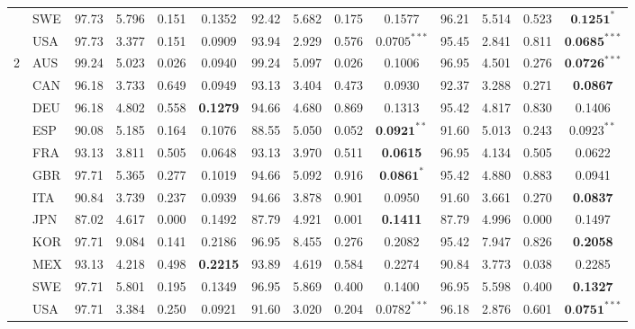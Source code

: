 \begin{tabular}{llcccccccccccc}
 &     SWE  &  97.73  &  5.796  &  0.151  &  0.1352  &  92.42  &  5.682  &  0.175  &  0.1577  &  96.21  &  5.514  &  0.523  & $\textbf{0.1251}^{*}$ \\
 &     USA  &  97.73  &  3.377  &  0.151  &  0.0909  &  93.94  &  2.929  &  0.576  & $ 0.0705 ^{***}$ &  95.45  &  2.841  &  0.811  & $\textbf{0.0685}^{***}$ \\
\toprule
\multirow{12}{*}{{2}}
                        &  AUS  &  99.24  &  5.023  &  0.026  &  0.0940  &  99.24  &  5.097  &  0.026  &  0.1006  &  96.95  &  4.501  &  0.276  & $\textbf{0.0726}^{***}$ \\
 &     CAN  &  96.18  &  3.733  &  0.649  &  0.0949  &  93.13  &  3.404  &  0.473  &  0.0930  &  92.37  &  3.288  &  0.271  &  \textbf{0.0867} \\ 
 &     DEU  &  96.18  &  4.802  &  0.558  &  \textbf{0.1279}  &  94.66  &  4.680  &  0.869  &  0.1313  &  95.42  &  4.817  &  0.830  &  0.1406 \\ 
 &     ESP  &  90.08  &  5.185  &  0.164  &  0.1076  &  88.55  &  5.050  &  0.052  & $ \textbf{0.0921} ^{**}$ &  91.60  &  5.013  &  0.243  & $0.0923^{**}$ \\
 &     FRA  &  93.13  &  3.811  &  0.505  &  0.0648  &  93.13  &  3.970  &  0.511  &  \textbf{0.0615}  &  96.95  &  4.134  &  0.505  &  0.0622 \\ 
 &     GBR  &  97.71  &  5.365  &  0.277  &  0.1019  &  94.66  &  5.092  &  0.916  & $ \textbf{0.0861} ^{*}$ &  95.42  &  4.880  &  0.883  &  0.0941 \\ 
 &     ITA  &  90.84  &  3.739  &  0.237  &  0.0939  &  94.66  &  3.878  &  0.901  &  0.0950  &  91.60  &  3.661  &  0.270  &  \textbf{0.0837} \\ 
 &     JPN  &  87.02  &  4.617  &  0.000  &  0.1492  &  87.79  &  4.921  &  0.001  &  \textbf{0.1411}  &  87.79  &  4.996  &  0.000  &  0.1497 \\ 
 &     KOR  &  97.71  &  9.084  &  0.141  &  0.2186  &  96.95  &  8.455  &  0.276  &  0.2082  &  95.42  &  7.947  &  0.826  &  \textbf{0.2058} \\ 
 &     MEX  &  93.13  &  4.218  &  0.498  &  \textbf{0.2215}  &  93.89  &  4.619  &  0.584  &  0.2274  &  90.84  &  3.773  &  0.038  &  0.2285 \\ 
 &     SWE  &  97.71  &  5.801  &  0.195  &  0.1349  &  96.95  &  5.869  &  0.400  &  0.1400  &  96.95  &  5.598  &  0.400  &  \textbf{0.1327} \\ 
 &     USA  &  97.71  &  3.384  &  0.250  &  0.0921  &  91.60  &  3.020  &  0.204  & $ 0.0782 ^{***}$ &  96.18  &  2.876  &  0.601  & $\textbf{0.0751}^{***}$ \\

\end{tabular}
